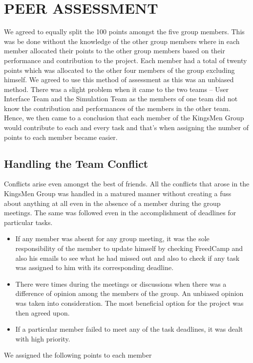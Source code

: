 \documentclass[11pt,a4paper]{article}
\begin{document}
\section{PEER ASSESSMENT}
We agreed to equally split the 100 points amongst the five group members. This was be done without the knowledge of the other group members where in each member allocated their points to the other group members based on their performance and contribution to the project. Each member had a total of twenty points which was allocated to the other four members of the group excluding himself.\newline
We agreed to use this method of assessment as this was an unbiased method. There was a slight problem when it came to the two teams -- User Interface Team and the Simulation Team as the members of one team did not know the contribution and performances of the members in the other team. Hence, we then came to a conclusion that each member of the KingsMen Group would contribute to each and every task and that’s when assigning the number of points to each member became easier.
\subsection{Handling the Team Conflict}
Conflicts arise even amongst the best of friends. All the conflicts that arose in the KingsMen Group was handled in a matured manner without creating a fuss about anything at all even in the absence of a member during the group meetings. The same was followed even in the accomplishment of deadlines for particular tasks.
\begin{itemize}
\item If any member was absent for any group meeting, it was the sole responsibility of the member to update himself by checking FreedCamp and also his emails to see what he had missed out and also to check if any task was assigned to him with its corresponding deadline.
\item There were times during the meetings or discussions when there was a difference of opinion among the members of the group. An unbiased opinion was taken into consideration. The most beneficial option for the project was then agreed upon.
\item If a particular member failed to meet any of the task deadlines, it was dealt with high priority.
\end{itemize}

We assigned the following points to each member \newline
\end{document}
